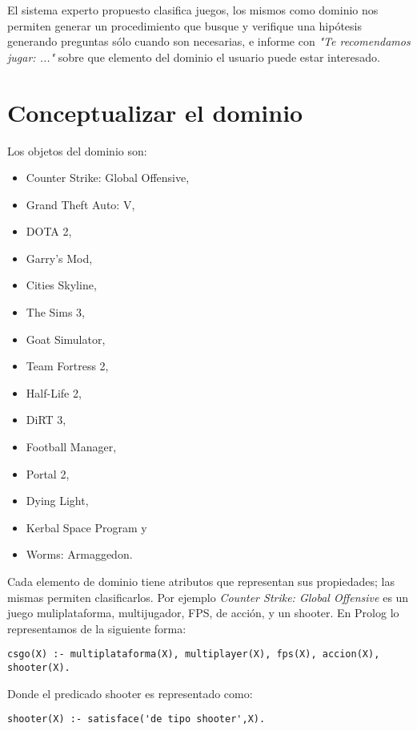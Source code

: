 \documentclass[11pt,oneside,a4paper]{article}
\begin{document}
El sistema experto propuesto clasifica juegos, los mismos como 
dominio nos permiten generar un procedimiento que busque y verifique
una hipótesis generando preguntas sólo cuando son necesarias, e informe con          %
\emph{"Te recomendamos jugar: ..."} sobre que elemento del dominio el
usuario puede estar interesado.


\section{Conceptualizar el dominio}

Los objetos del dominio son:

\begin{multicols}{2}
\begin{itemize}
\item Counter Strike: Global Offensive,
\item Grand Theft Auto: V,
\item DOTA 2,
\item Garry's Mod,
\item Cities Skyline,
\item The Sims 3,
\item Goat Simulator,
\item Team Fortress 2,
\item Half-Life 2,
\item DiRT 3,
\item Football Manager,
\item Portal 2,
\item Dying Light,
\item Kerbal Space Program y
\item Worms: Armaggedon.
\end{itemize}
\end{multicols}

Cada elemento de dominio tiene atributos que representan sus propiedades; las
mismas permiten clasificarlos. Por ejemplo \emph{Counter Strike: Global Offensive}
es un juego muliplataforma, multijugador, FPS, de acción, y un shooter. En Prolog 
lo representamos de la siguiente forma:

\begin{verbatim}
csgo(X) :- multiplataforma(X), multiplayer(X), fps(X), accion(X), shooter(X).
\end{verbatim}

Donde el predicado shooter es representado como:

\begin{verbatim}
shooter(X) :- satisface('de tipo shooter',X).
\end{verbatim}
\end{document}

